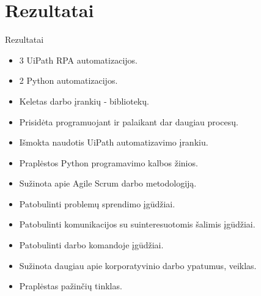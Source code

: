 \section{Rezultatai}

\begin{frame}[c]{Rezultatai}
    \begin{minipage}{0.48\textwidth}
        \begin{itemize}
            \item 3 UiPath RPA automatizacijos.
            \item 2 Python automatizacijos.
            \item Keletas darbo įrankių ‐ bibliotekų.
            \item Prisidėta programuojant ir palaikant dar daugiau procesų. 
            \item Išmokta naudotis UiPath automatizavimo įrankiu. 
            \item Praplėstos Python programavimo kalbos žinios.
        \end{itemize}
    \end{minipage}
    \begin{minipage}{0.48\textwidth}
        \begin{itemize}
            \item Sužinota apie Agile Scrum darbo metodologiją.
            \item Patobulinti problemų sprendimo įgūdžiai.
            \item Patobulinti komunikacijos su suinteresuotomis šalimis įgūdžiai.
            \item Patobulinti darbo komandoje įgūdžiai.
            \item Sužinota daugiau apie korporatyvinio darbo ypatumus, veiklas.
            \item Praplėstas pažinčių tinklas.
        \end{itemize}
    \end{minipage}
\end{frame}

